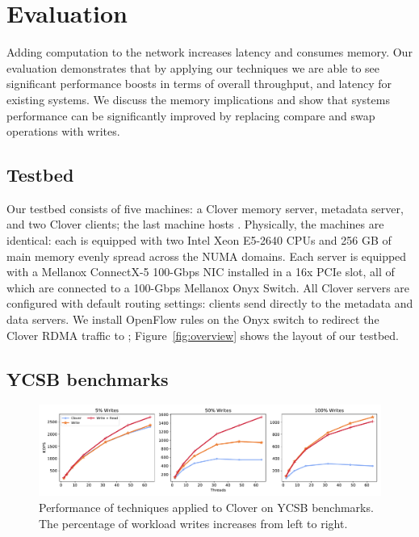 \section{Evaluation}
\label{s:results}

Adding computation to the network increases latency and consumes memory. Our
evaluation demonstrates that by applying our techniques we are able to see
significant performance boosts in terms of overall throughput, and latency for
existing systems. We discuss the memory implications and show that systems
performance can be significantly improved by replacing compare and swap
operations with writes.

\subsection{Testbed}

Our testbed consists of five machines: a Clover memory server, metadata server,
and two Clover clients; the last machine hosts {\sword}. Physically, the
machines are identical: each is equipped with two Intel Xeon E5-2640 CPUs and
256 GB of main memory evenly spread across the NUMA domains. Each server is
equipped with a Mellanox ConnectX-5 100-Gbps NIC installed in a 16x PCIe slot,
all of which are connected to a 100-Gbps Mellanox Onyx Switch. All Clover
servers are configured with default routing settings: clients send directly to
the metadata and data servers. We install OpenFlow rules on the Onyx switch to
redirect the Clover RDMA traffic to \sword; Figure~\ref{fig:overview} shows the
layout of our testbed.

\subsection{YCSB benchmarks}

\begin{figure}
    \includegraphics[width=1.0\textwidth]{fig/full_system_performance.pdf}

    \caption{{Performance of {\sword} techniques applied to Clover on YCSB
    benchmarks. The percentage of workload writes increases from left to
    right.}}

    \label{fig:full_system_performance}
\end{figure}

